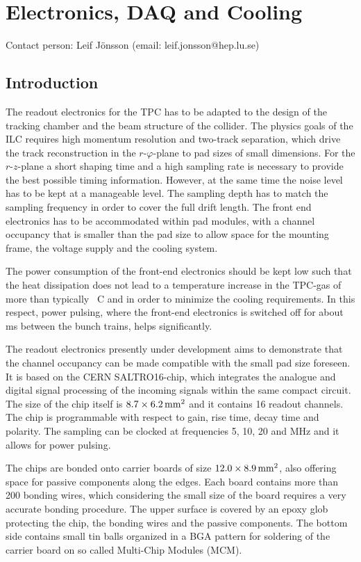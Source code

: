 \section{Electronics, DAQ and Cooling}\label{chap:TPC_sec:electronics}
Contact person: Leif J{\"o}nsson (email: leif.jonsson@hep.lu.se)\\

\subsection{Introduction}
The readout electronics for the TPC has to be adapted to the design of the tracking chamber and the beam structure of the collider. The physics goals of the ILC requires high momentum resolution and two-track separation, which drive the track reconstruction in the $r\text{-}\varphi$-plane to pad sizes of small dimensions. For the $r\text{-}z$-plane a short shaping time and a high sampling rate is necessary to provide the best possible timing information. However, at the same time the noise level has to be kept at a manageable level. The sampling depth has to match the sampling frequency in order to cover the full drift length. The front end electronics has to be accommodated within pad modules, with a channel occupancy that is smaller than the pad size to allow space for the mounting frame, the voltage supply and the cooling system.

The power consumption of the front-end electronics should be kept low such that the heat dissipation does not lead to a temperature increase in the TPC-gas of more than typically \unit[1]{\textdegree C} and in order to minimize the cooling requirements. In this respect, power pulsing, where the front-end electronics is switched off for about \unit[199]{ms} between the bunch trains, helps significantly.

The readout electronics presently under development aims to demonstrate that the channel occupancy can be made compatible with the small pad size foreseen. It is based on the CERN SALTRO16-chip, which integrates the analogue and digital signal processing of the incoming signals within the same compact circuit. The size of the chip itself is $8.7 \times \unit[6.2]{mm^2}$ and it contains 16 readout channels. The chip is programmable with respect to gain, rise time, decay time and polarity. The sampling can be clocked at frequencies 5, 10, 20 and \unit[40]{MHz} and it allows for power pulsing.

\noindent The chips are bonded onto carrier boards of size $12.0 \times \unit[8.9]{mm^2}$, also offering space for passive components along the edges. Each board contains more than 200 bonding wires, which considering the small size of the board requires a very accurate bonding procedure. The upper surface is covered by an epoxy glob protecting the chip, the bonding wires and the passive components. The bottom side contains small tin balls organized in a BGA pattern for soldering of the carrier board on so called Multi-Chip Modules (MCM).

